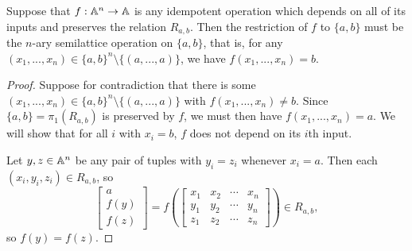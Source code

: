 \documentclass[letterpaper,11pt]{article}
\begin{document}
\begin{prop} Suppose that $f : \mathbb{A}^n \rightarrow \mathbb{A}$ is any idempotent operation which depends on all of its inputs and preserves the relation $R_{a,b}$. Then the restriction of $f$ to $\{a,b\}$ must be the $n$-ary semilattice operation on $\{a,b\}$, that is, for any $(x_1, ..., x_n) \in \{a,b\}^n \setminus \{(a,...,a)\}$, we have $f(x_1, ..., x_n) = b$.
\end{prop}
\begin{proof} Suppose for contradiction that there is some $(x_1, ..., x_n) \in \{a,b\}^n \setminus \{(a,...,a)\}$ with $f(x_1, ..., x_n) \ne b$. Since $\{a,b\} = \pi_1(R_{a,b})$ is preserved by $f$, we must then have $f(x_1, ..., x_n) = a$. We will show that for all $i$ with $x_i = b$, $f$ does not depend on its $i$th input.

Let $y, z \in \mathbb{A}^n$ be any pair of tuples with $y_i = z_i$ whenever $x_i = a$. Then each $(x_i,y_i,z_i) \in R_{a,b}$, so
\[
\begin{bmatrix} a\\ f(y)\\ f(z)\end{bmatrix} = f\left(\begin{bmatrix} x_1 & x_2 & \cdots & x_n\\ y_1 & y_2 & \cdots & y_n\\ z_1 & z_2 & \cdots & z_n\end{bmatrix}\right) \in R_{a,b},
\]
so $f(y) = f(z)$.
\end{proof}
\end{document}
